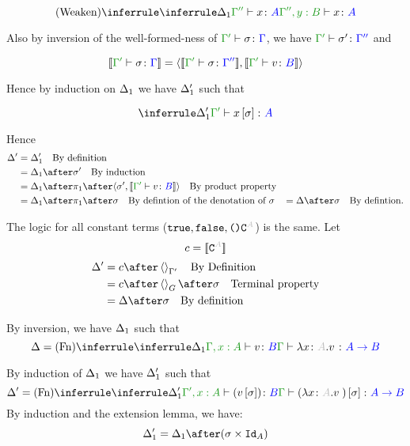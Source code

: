 \documentclass{report}
\begin{document}
\begin{equation}
    \ntreeruleI{Weaken}{\treeruleI{\D_1}{\typerelation{\G''}{x}{A}}}{\typerelation{\G'',y: B}{x}{A}}
\end{equation}

Also by inversion of the well-formed-ness of $\typerelation{\G'}{\si}{\G}$, we have $\typerelation{\G'}{\si'}{\G''}$ and 

\begin{equation}
    \deno{\typerelation{\G'}{\si}{\G}} = \pr{\deno{\typerelation{\G'}{\si}{\G''}}}{\deno{\typerelation{\G'}{v}{B}}}
\end{equation}

Hence by induction on $\Delta_1$ we have $\Delta_1'$ such that

\begin{equation}
    \treeruleI{\D_1'}{\typerelation{\G'}{x\ssi}{A}}
\end{equation}



Hence
\begin{align*}
    \D' & = \D_1' \qt{By definition}\\
        & = \D_1\after\si'\qt{By induction}\\
        & = \D_1\after\p\after\pr{\si'}{\deno{\typerelation{\G'}{v}{B}}}\qt{By product property}\\
        & = \D_1\after\p\after\si\qt{By defintion of the denotation of $\si$}
        & = \D\after\si\qt{By defintion.}
\end{align*}

The logic for all constant terms ($\t,\f,\u\const{A}$) is the same.
Let
\begin{equation}
    c = \deno{\const{A}}
\end{equation}
\begin{align*}
    \D' & = c\after\term{\G'}\qt{By Definition}\\
        & = c\after\term{G}\after\si\qt{Terminal property}\\
        & = \D\after\si\qt{By definition}
\end{align*}

By inversion, we have $\Delta_1$ such that
\begin{equation}
    \D = \ntreeruleI{Fn}{
        \treeruleI{\D_1}{\typerelation{\G, x:A}{v}{B}}
    }{\typerelation{\G}{\lam{x}{A}{v}}{\ab}}
\end{equation}

By induction of $\Delta_1$ we have $\Delta_1'$ such that
\begin{equation}
    \D' = \ntreeruleI{Fn}{
        \treeruleI{\D_1'}{\typerelation{\G', x:A}{(v\ssi)}{B}}
    }{\typerelation{\G}{(\lam{x}{A}{v})\ssi}{\ab}}
\end{equation}
By induction and the extension lemma, we have:
\begin{equation}
    \D_1' = \D_1\after(\si\times\Id{A})
\end{equation}
\end{document}
